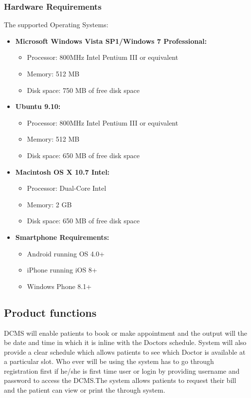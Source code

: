 \documentclass[12pt]{article}
\begin{document}
    \subsubsection{Hardware Requirements}
The supported Operating Systems:
\begin{itemize}

\item
        \textbf{Microsoft Windows Vista SP1/Windows 7 Professional:}
        \begin{itemize}
        
            \item
            Processor: 800MHz Intel Pentium III or equivalent
            \item
            Memory: 512 MB
            \item
            Disk space: 750 MB of free disk space
            \end{itemize}
\item
        \textbf{Ubuntu 9.10:}
        \begin{itemize}
        \item
            Processor: 800MHz Intel Pentium III or equivalent
            \item
            Memory: 512 MB
            \item
            Disk space: 650 MB of free disk space
            \end{itemize}
        \item
        \textbf{Macintosh OS X 10.7 Intel:}
        \begin{itemize}
        
            \item
            Processor: Dual-Core Intel
            \item
            Memory: 2 GB
            \item
            Disk space: 650 MB of free disk space
            \end{itemize}
            \item
            \textbf{Smartphone Requirements:}
\begin{itemize}

\item
    Android running OS 4.0+
    \item
    iPhone running iOS 8+
    \item
    Windows Phone 8.1+
\end{itemize}
\end{itemize}
    \subsection{Product functions}
DCMS will enable patients to book or make appointment and the output will the be date and time in which it is inline with the Doctors schedule. System will
    also provide a clear schedule which allows patients to see
    which Doctor is available at a particular slot. Who ever
    will be using the system has to go through registration
    first if he/she is first time user or login by providing
    username and password to access the DCMS.The system allows patients to request their bill and the patient can view or print the through system.
\end{document}
